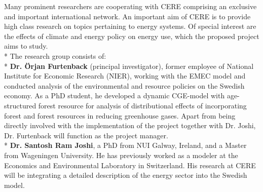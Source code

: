 Many prominent researchers are cooperating with CERE comprising an exclusive and important international network. An important aim of CERE is to provide high class research on topics pertaining to energy systems. Of special interest are the effects of climate and energy policy on energy use, which the proposed project aims to study.\\*
The research group consists of:\\*
\textbf{Dr. Örjan Furtenback} (principal investigator), former employee of National Institute for Economic Research (NIER), working with the EMEC model and conducted analysis of the environmental and resource policies on the Swedish economy. As a PhD student, he developed a dynamic CGE-model with age-structured forest resource for analysis of distributional effects of incorporating forest and forest resources in reducing greenhouse gases. Apart from being directly involved with the implementation of the project together with Dr. Joshi, Dr. Furtenback will function as the project manager.\\*
\textbf{Dr. Santosh Ram Joshi}, a PhD from NUI Galway, Ireland, and a Master from Wageningen University. He has previously worked as a modeler at the Economics and Environmental Laboratory in Switzerland. His research at CERE will be integrating a detailed description of the energy sector into the Swedish model.

